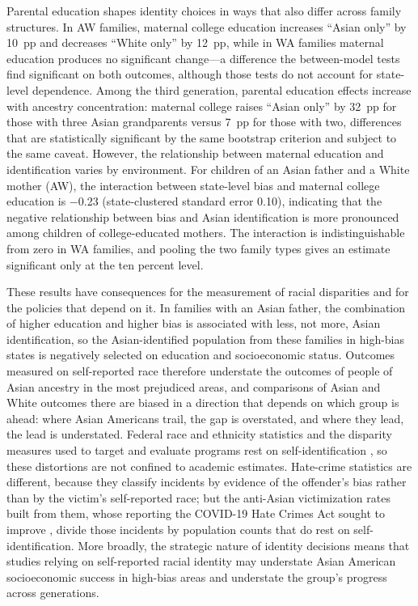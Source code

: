 Parental education shapes identity choices in ways that also differ across family structures. In AW families, maternal college education increases ``Asian only'' by 10~pp and decreases ``White only'' by 12~pp, while in WA families maternal education produces no significant change---a difference the between-model tests find significant on both outcomes, although those tests do not account for state-level dependence. Among the third generation, parental education effects increase with ancestry concentration: maternal college raises ``Asian only'' by 32~pp for those with three Asian grandparents versus 7~pp for those with two, differences that are statistically significant by the same bootstrap criterion and subject to the same caveat. However, the relationship between maternal education and identification varies by environment. For children of an Asian father and a White mother (AW), the interaction between state-level bias and maternal college education is $-$0.23 (state-clustered standard error 0.10), indicating that the negative relationship between bias and Asian identification is more pronounced among children of college-educated mothers. The interaction is indistinguishable from zero in WA families, and pooling the two family types gives an estimate significant only at the ten percent level.
 
These results have consequences for the measurement of racial disparities and for the policies that depend on it. In families with an Asian father, the combination of higher education and higher bias is associated with less, not more, Asian identification, so the Asian-identified population from these families in high-bias states is negatively selected on education and socioeconomic status. Outcomes measured on self-reported race therefore understate the outcomes of people of Asian ancestry in the most prejudiced areas, and comparisons of Asian and White outcomes there are biased in a direction that depends on which group is ahead: where Asian Americans trail, the gap is overstated, and where they lead, the lead is understated. Federal race and ethnicity statistics and the disparity measures used to target and evaluate programs rest on self-identification \autocite{ombRevisionsStatisticalPolicy2024}, so these distortions are not confined to academic estimates. Hate-crime statistics are different, because they classify incidents by evidence of the offender's bias rather than by the victim's self-reported race; but the anti-Asian victimization rates built from them, whose reporting the COVID-19 Hate Crimes Act sought to improve \autocite{covid19HateCrimesAct2021}, divide those incidents by population counts that do rest on self-identification. More broadly, the strategic nature of identity decisions means that studies relying on self-reported racial identity may understate Asian American socioeconomic success in high-bias areas and understate the group's progress across generations.
 
